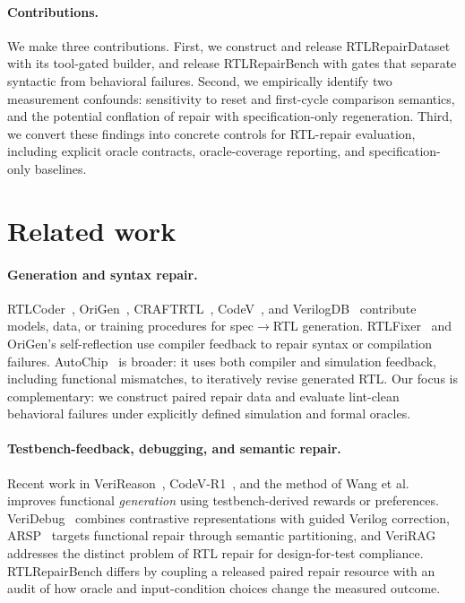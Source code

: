 \documentclass{article}
\renewcommand{\to}{\ensuremath{\rightarrow}}
\begin{document}
\paragraph{Contributions.}
We make three contributions. First, we construct and release RTLRepairDataset with its tool-gated
builder, and release RTLRepairBench with gates that separate syntactic from behavioral
failures. Second, we
empirically identify two measurement confounds: sensitivity to reset and first-cycle comparison
semantics, and the potential conflation of repair with specification-only regeneration. Third, we
convert these findings into concrete controls for RTL-repair evaluation, including explicit oracle
contracts, oracle-coverage reporting, and specification-only baselines.

\section{Related work}

\paragraph{Generation and syntax repair.}
RTLCoder~\cite{rtlcoder}, OriGen~\cite{origen}, CRAFTRTL~\cite{craftrtl},
CodeV~\cite{codev}, and VerilogDB~\cite{verilogdb} contribute models, data, or training procedures
for spec\to RTL generation. RTLFixer~\cite{rtlfixer} and OriGen's self-reflection use compiler
feedback to repair syntax or compilation failures. AutoChip~\cite{autochip} is broader: it uses both
compiler and simulation feedback, including functional mismatches, to iteratively revise generated
RTL. Our focus is complementary: we construct paired repair data and evaluate lint-clean behavioral
failures under explicitly defined simulation and formal oracles.

\paragraph{Testbench-feedback, debugging, and semantic repair.}
Recent work in VeriReason~\cite{verireason}, CodeV-R1~\cite{codevr1}, and
the method of Wang et al.~\cite{verilogprefer} improves functional \emph{generation} using
testbench-derived rewards or preferences. VeriDebug~\cite{veridebug} combines contrastive
representations with guided Verilog correction, ARSP~\cite{arsp} targets functional repair through
semantic partitioning, and VeriRAG~\cite{verirag} addresses the distinct problem of RTL repair for
design-for-test compliance. RTLRepairBench differs by coupling a released paired repair resource
with an audit of how oracle and input-condition choices change the measured outcome.
\end{document}
